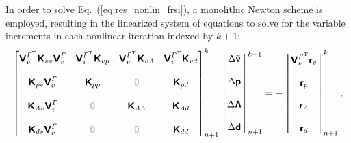 In order to solve Eq.~(\ref{eq:res_nonlin_frsi}), a monolithic Newton scheme is employed, resulting in the linearized system of equations to solve for the variable increments in each nonlinear iteration indexed by $k+1$:
\begin{align}
    \begin{bmatrix} \boldsymbol{\mathsf{V}}_{v}^{\mathit{\Gamma}^\mathrm{T}}\boldsymbol{\mathsf{K}}_{vv}\boldsymbol{\mathsf{V}}_{v}^{\mathit{\Gamma}} & \boldsymbol{\mathsf{V}}_{v}^{\mathit{\Gamma}^\mathrm{T}}\boldsymbol{\mathsf{K}}_{vp} & \boldsymbol{\mathsf{V}}_{v}^{\mathit{\Gamma}^\mathrm{T}}\boldsymbol{\mathsf{K}}_{v\mathit{\Lambda}} & \boldsymbol{\mathsf{V}}_{v}^{\mathit{\Gamma}^\mathrm{T}}\boldsymbol{\mathsf{K}}_{vd} \\ \\ \boldsymbol{\mathsf{K}}_{pv}\boldsymbol{\mathsf{V}}_{v}^{\mathit{\Gamma}} & \boldsymbol{\mathsf{K}}_{pp} & \textcolor{lightgray}{\boldsymbol{\mathsf{0}}} & \boldsymbol{\mathsf{K}}_{pd} \\ \\  \boldsymbol{\mathsf{K}}_{\mathit{\Lambda} v}\boldsymbol{\mathsf{V}}_{v}^{\mathit{\Gamma}} & \textcolor{lightgray}{\boldsymbol{\mathsf{0}}} & \boldsymbol{\mathsf{K}}_{\mathit{\Lambda}\mathit{\Lambda}} & \boldsymbol{\mathsf{K}}_{\mathit{\Lambda} d} \\ \\ \boldsymbol{\mathsf{K}}_{dv}\boldsymbol{\mathsf{V}}_{v}^{\mathit{\Gamma}} & \textcolor{lightgray}{\boldsymbol{\mathsf{0}}} & \textcolor{lightgray}{\boldsymbol{\mathsf{0}}} & \boldsymbol{\mathsf{K}}_{dd} \end{bmatrix}_{n+1}^{k}\begin{bmatrix} \Delta\tilde{\boldsymbol{\mathsf{v}}} \\ \\ \Delta\boldsymbol{\mathsf{p}} \\ \\ \Delta\boldsymbol{\mathsf{\Lambda}} \\ \\ \Delta\boldsymbol{\mathsf{d}} \end{bmatrix}_{n+1}^{k+1}=-\begin{bmatrix} \boldsymbol{\mathsf{V}}_{v}^{\mathit{\Gamma}^\mathrm{T}}\boldsymbol{\mathsf{r}}_{v} \\ \\ \boldsymbol{\mathsf{r}}_{p} \\ \\ \boldsymbol{\mathsf{r}}_{\mathit{\Lambda}} \\ \\  \boldsymbol{\mathsf{r}}_{d} \end{bmatrix}_{n+1}^{k} \label{eq:lin_sys_rom_frsi_mono},
\end{align}
